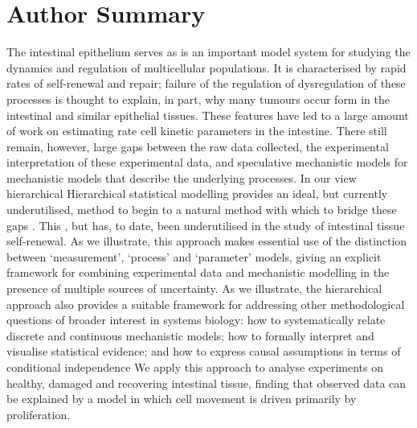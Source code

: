 \documentclass[10pt,letterpaper]{article}
\providecommand{\DIFaddtex}[1]{{\protect\color{blue} \sf #1}} %
\providecommand{\DIFdeltex}[1]{{\protect\color{red} \scriptsize #1}} %
\providecommand{\DIFaddbegin}{} %
\providecommand{\DIFaddend}{} %
\providecommand{\DIFdelbegin}{} %
\providecommand{\DIFdelend}{} %
\providecommand{\DIFadd}[1]{\texorpdfstring{\DIFaddtex{#1}}{#1}} %
\providecommand{\DIFdel}[1]{\texorpdfstring{\DIFdeltex{#1}}{}} %
\begin{document}
\section{Author Summary}\label{author-summary}

The intestinal epithelium \DIFdelbegin \DIFdel{serves as }\DIFdelend \DIFaddbegin \DIFadd{is }\DIFaddend an important model system for studying the
dynamics and regulation of multicellular populations. It is
characterised by rapid rates of self-renewal and repair; \DIFdelbegin \DIFdel{failure of the
regulation of }\DIFdelend \DIFaddbegin \DIFadd{dysregulation
of }\DIFaddend these processes is thought to explain, in part, why many tumours \DIFdelbegin \DIFdel{occur }\DIFdelend \DIFaddbegin \DIFadd{form
}\DIFaddend in the intestinal and similar epithelial tissues. These features have
led to a large amount of work on estimating \DIFdelbegin \DIFdel{rate
}\DIFdelend \DIFaddbegin \DIFadd{cell kinetic }\DIFaddend parameters in
the intestine. There \DIFdelbegin \DIFdel{still }\DIFdelend remain, however, large gaps between the raw data
collected, the \DIFdelbegin \DIFdel{experimental }\DIFdelend interpretation of these \DIFaddbegin \DIFadd{experimental }\DIFaddend data, and
\DIFdelbegin \DIFdel{speculative mechanistic models for }\DIFdelend \DIFaddbegin \DIFadd{mechanistic models that describe the }\DIFaddend underlying processes. \DIFdelbegin \DIFdel{In
our view hierarchical }\DIFdelend \DIFaddbegin \DIFadd{Hierarchical
}\DIFaddend statistical modelling provides \DIFdelbegin \DIFdel{an ideal, but
currently underutilised, method to begin to }\DIFdelend \DIFaddbegin \DIFadd{a natural method with which to }\DIFaddend bridge
these gaps\DIFdelbegin \DIFdel{. This
}\DIFdelend \DIFaddbegin \DIFadd{, but has, to date, been underutilised in the study of
intestinal tissue self-renewal. As we illustrate, this }\DIFaddend approach makes
essential use of the distinction between `measurement', `process' and
`parameter' models, giving an explicit framework for combining
experimental data and mechanistic modelling in the presence of multiple
sources of uncertainty. \DIFdelbegin \DIFdel{As we illustrate, the hierarchical
approach also provides a suitable framework for addressing other
methodological questions of broader interest in systems biology: how to systematically relate discrete and continuous mechanistic models; how to
formally interpret and visualise statistical evidence; and how to
express causal assumptions in terms of conditional independence}\DIFdelend \DIFaddbegin \DIFadd{We apply this approach to analyse experiments on
healthy, damaged and recovering intestinal tissue, finding that observed
data can be explained by a model in which cell movement is driven
primarily by proliferation}\DIFaddend .
\end{document}
